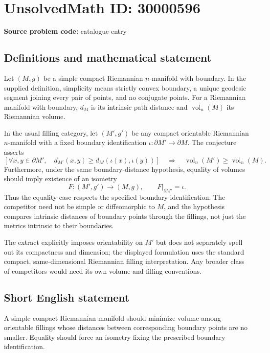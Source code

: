 \documentclass[11pt]{article}
\begin{document}
\section*{UnsolvedMath ID: 30000596}
\textbf{Source problem code:} catalogue entry
\subsection{Definitions and mathematical statement}
Let $(M,g)$ be a simple compact Riemannian $n$-manifold with boundary. In the supplied definition, simplicity means strictly convex boundary, a unique geodesic segment joining every pair of points, and no conjugate points. For a Riemannian manifold with boundary, $d_M$ is its intrinsic path distance and $\operatorname{vol}_n(M)$ its Riemannian volume.

In the usual filling category, let $(M',g')$ be any compact orientable Riemannian $n$-manifold with a fixed boundary identification $\iota:\partial M'\to\partial M$. The conjecture asserts
\[
\left[\forall x,y\in\partial M',\quad
d_{M'}(x,y)\geq d_M(\iota(x),\iota(y))\right]
\quad\Longrightarrow\quad
\operatorname{vol}_n(M')\geq\operatorname{vol}_n(M).
\]
Furthermore, under the same boundary-distance hypothesis, equality of volumes should imply existence of an isometry
\[
F:(M',g')\longrightarrow(M,g),\qquad F|_{\partial M'}=\iota.
\]
Thus the equality case respects the specified boundary identification. The competitor need not be simple or diffeomorphic to $M$, and the hypothesis compares intrinsic distances of boundary points through the fillings, not just the metrics intrinsic to their boundaries.

The extract explicitly imposes orientability on $M'$ but does not separately spell out its compactness and dimension; the displayed formulation uses the standard compact, same-dimensional Riemannian filling interpretation. Any broader class of competitors would need its own volume and filling conventions.
\subsection{Short English statement}
A simple compact Riemannian manifold should minimize volume among orientable fillings whose distances between corresponding boundary points are no smaller. Equality should force an isometry fixing the prescribed boundary identification.
\end{document}

